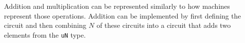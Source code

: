 Addition and multiplication can be represented similarly to how machines represent those operations. Addition can be implemented by first defining the  circuit and then combining $N$ of  these circuits into a circuit that adds two elements from the \texttt{uN} type.
\begin{comment}
To understand the algebraic circuit for the $1$-bit full, recall that we already defined circuits for boolean algebra in the previous section. Abstracting over those circuits, a full adder circuit can then be defined as:
\begin{center}
\digraph[scale=0.4]{ONEBFULLADD}{
  forcelabels=true;
  center=true;
  splines=ortho;
  nodesep= 2.0;
  
  subgraph clusterin {
    nADD01 [shape=box, label="bx_j"] ;
    nADD02 [shape=box, label="by_j"] ;
    nADD03 [shape=box, label="c_(j-1)"] ;
    color = white ;
  }
  
  subgraph clustermid {
    nADD04 [shape=box, label="XOR"] ;
    nADD05 [shape=box, label="XOR"] ;
    nADD06 [shape=box, label="AND"] ;
    nADD07 [shape=box, label="AND"] ;
    nADD08 [shape=box, label="OR"] ;
    
    nADD04 -> {nADD05, nADD06} ;
    nADD06 -> nADD08 ;
    nADD07 -> nADD08 ;
    
    color = white ;
  }
  
  subgraph clusterout {
    nADD09 [shape=box, label="bz_j"] ;
    nADD010 [shape=box, label="c_j"] ;
    color = white ;
  }
  
  nADD01 -> {nADD04, nADD07} ;
  nADD02 -> {nADD04, nADD07} ;
  nADD03 -> {nADD05, nADD06} ;
  nADD05 -> nADD09 ;
  nADD08 -> nADD010 ; 
}
\end{center}
In this circuit the output $bz_j$ is the result of the binary input $bx_j$ and $by_j$, where $bx_j$ is the $j$-th bit of the binary representation of the first summand and $by_j$ is the $j$-th bit of the binary representation of the second summand. The output $c_j$ is the carry bit of the addition and the input $c_{j-1}$ is is the carry bit which is supposed to be either $0$ for $j=0$ or the carry bit output of the previous full adder circuit. Abstracting the $1$-bit adder, we write:
\begin{center}
\digraph[scale=0.6]{BADDMETA}{
  forcelabels=true;
  center=true;
  splines=ortho;
  //nodesep= 2.0;
  n1 [shape=box, label="FULLADD"] ;
  n2 [shape=none, label="bx_j"] ;
  n3 [shape=none, label="by_j"] ;
  n4 [shape=none, label="c_(j-1)"] ;
  n5 [shape=none, label="bz_j"] ;
  n6 [shape=none, label="c_j"] ;
  n2 -> n1 ;
  n3 -> n1 ;
  n4 -> n1 ;
  n1 -> {n5, n6} ;
}
\end{center}
With a circuit definition of the $1$-bit full adder at hand, addition of two uIntN type elements can then be defined as
\begin{center}
\digraph[scale=0.4]{UINTADD}{
  forcelabels=true;
  center=true;
  splines=ortho;
  //nodesep= 2.0;
  

\end{comment}
